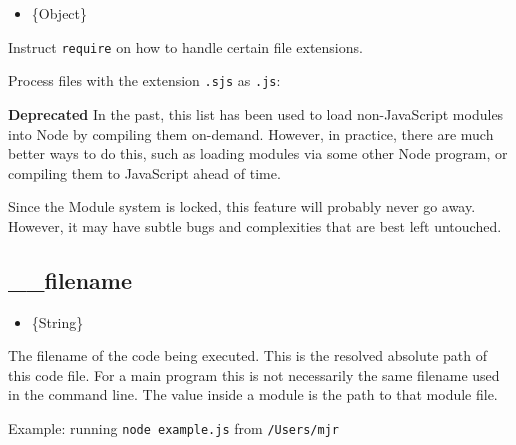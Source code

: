 \begin{itemize}
\itemsep1pt\parskip0pt
\item
  \{Object\}
\end{itemize}

Instruct \texttt{require} on how to handle certain file extensions.

Process files with the extension \texttt{.sjs} as \texttt{.js}:

\begin{Shaded}
\begin{Highlighting}[]
\NormalTok{[}\NormalTok{] = }\NormalTok{[}\NormalTok{];}
\end{Highlighting}
\end{Shaded}

\textbf{Deprecated} In the past, this list has been used to load
non-JavaScript modules into Node by compiling them on-demand. However,
in practice, there are much better ways to do this, such as loading
modules via some other Node program, or compiling them to JavaScript
ahead of time.

Since the Module system is locked, this feature will probably never go
away. However, it may have subtle bugs and complexities that are best
left untouched.

\subsection{\_\_filename}\label{filename}

\begin{itemize}
\itemsep1pt\parskip0pt
\item
  \{String\}
\end{itemize}

The filename of the code being executed. This is the resolved absolute
path of this code file. For a main program this is not necessarily the
same filename used in the command line. The value inside a module is the
path to that module file.

Example: running \texttt{node\ example.js} from \texttt{/Users/mjr}

\begin{Shaded}
\begin{Highlighting}[]
\end{Highlighting}
\end{Shaded}

